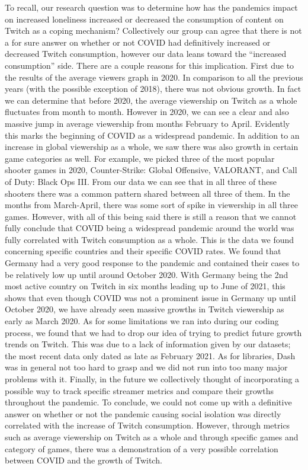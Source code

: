 \documentclass[fontsize=11pt]{article}
\begin{document}
To recall, our research question was to determine how has the pandemics impact on increased loneliness increased or decreased the consumption of content on Twitch as a coping mechanism? Collectively our group can agree that there is not a for sure answer on whether or not COVID had definitively increased or decreased Twitch consumption, however our data leans toward the “increased consumption” side. There are a couple reasons for this implication. First due to the results of the average viewers graph in 2020. In comparison to all the previous years (with the possible exception of 2018), there was not obvious growth. In fact we can determine that before 2020, the average viewership on Twitch as a whole fluctuates from month to month. However in 2020, we can see a clear and also massive jump in average viewership from months February to April. Evidently this marks the beginning of COVID as a widespread pandemic. In addition to an increase in global viewership as a whole, we saw there was also growth in certain game categories as well. For example, we picked three of the most popular shooter games in 2020, Counter-Strike: Global Offensive, VALORANT, and Call of Duty: Black Ops III. From our data we can see that in all three of these shooters there was a common pattern shared between all three of them. In the months from March-April, there was some sort of spike in viewership in all three games. However, with all of this being said there is still a reason that we cannot fully conclude that COVID being a widespread pandemic around the world was fully correlated with Twitch consumption as a whole. This is the data we found concerning specific countries and their specific COVID rates. We found that Germany had a very good response to the pandemic and contained their cases to be relatively low up until around October 2020. With Germany being the 2nd most active country on Twitch in six months leading up to June of 2021, this shows that even though COVID was not a prominent issue in Germany up until October 2020, we have already seen massive growths in Twitch viewership as early as March 2020. As for some limitations we ran into during our coding process, we found that we had to drop our idea of trying to predict future growth trends on Twitch. This was due to a lack of information given by our datasets; the most recent data only dated as late as February 2021. As for libraries, Dash was in general not too hard to grasp and we did not run into too many major problems with it. Finally, in the future we collectively thought of incorporating a possible way to track specific streamer metrics and compare their growths throughout the pandemic. To conclude, we could not come up with a definitive answer on whether or not the pandemic causing social isolation was directly correlated with the increase of Twitch consumption. However, through metrics such as average viewership on Twitch as a whole and through specific games and category of games, there was a demonstration of a very possible correlation between COVID and the growth of Twitch.
\end{document}

